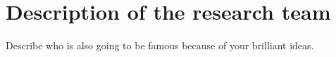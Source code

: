 \section{Description of the research team}
Describe who is also going to be famous because of your brilliant ideas.